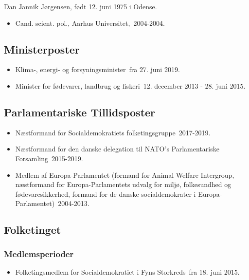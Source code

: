 \documentclass[11pt, a4paper]{awesome-cv}
\begin{document}
\makecvheader[R]
\makelettertitle
\begin{cvletter}
Dan Jannik Jørgensen, født 12. juni 1975 i Odense.



\begin{itemize}
\item Cand. scient. pol., Aarhus Universitet, 2004-2004.
\end{itemize}
\subsection*{Ministerposter}
\begin{itemize}
\item Klima-, energi- og forsyningsminister fra 27. juni 2019.
\item Minister for fødevarer, landbrug og fiskeri 12. december 2013 - 28. juni 2015.
\end{itemize}
\subsection*{Parlamentariske Tillidsposter}
\begin{itemize}
\item Næstformand for Socialdemokratiets folketingsgruppe 2017-2019.
\item Næstformand for den danske delegation til NATO's Parlamentariske Forsamling 2015-2019.
\item Medlem af Europa-Parlamentet (formand for Animal Welfare Intergroup, næstformand for Europa-Parlamentets udvalg for miljø, folkesundhed og fødevaresikkerhed, formand for de danske socialdemokrater i Europa-Parlamentet) 2004-2013.
\end{itemize}
\subsection*{Folketinget}
\subsubsection*{Medlemsperioder}
\begin{itemize}
\item Folketingsmedlem for Socialdemokratiet i Fyns Storkreds fra 18. juni 2015.
\end{itemize}

\end{cvletter}
\end{document}
